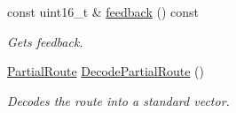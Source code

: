 \begin{DoxyCompactItemize}
const uint16\+\_\+t \& \hyperlink{classosse_1_1collaborate_1_1_packet_forward_ada8a2b432af1e7e4dc09bcf056e45273}{feedback} () const
\begin{DoxyCompactList}\small\item\em Gets feedback. \end{DoxyCompactList}\item 
\hyperlink{classosse_1_1collaborate_1_1_packet_forward_a4627beb1294e822a7eec6038969a5da0}{Partial\+Route} \hyperlink{classosse_1_1collaborate_1_1_packet_forward_a1c3ee630b59d3db2a4e9e7484c1c7752}{Decode\+Partial\+Route} ()
\begin{DoxyCompactList}\small\item\em Decodes the route into a standard vector. \end{DoxyCompactList}\end{DoxyCompactItemize}
